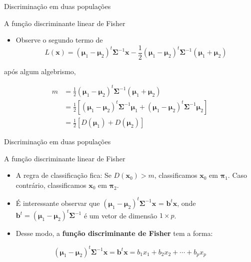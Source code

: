 \documentclass[
  ignorenonframetext,
  aspectratio=169,
]{beamer}
\providecommand{\tightlist}{%
  \setlength{\itemsep}{0pt}\setlength{\parskip}{0pt}}
\begin{document}
\begin{frame}{Discriminação em duas populações}
\label{discriminauxe7uxe3o-em-duas-populauxe7uxf5es-4}
\begin{block}{A função discriminante linear de Fisher}
\label{a-funuxe7uxe3o-discriminante-linear-de-fisher-4}
\begin{itemize}
\tightlist
\item
  Observe o segundo termo de \[
  L(\boldsymbol{x}) = (\boldsymbol{\mu}_1 - \boldsymbol{\mu}_2)^t \boldsymbol{\Sigma}^{-1} \boldsymbol{x} - \displaystyle{\frac{1}{2}(\boldsymbol{\mu}_1 - \boldsymbol{\mu}_2)^t \boldsymbol{\Sigma}^{-1}(\boldsymbol{\mu}_1 + \boldsymbol{\mu}_2)}
  \]
\end{itemize}

após algum algebrismo,

\[
\begin{aligned}
m &= \displaystyle{\frac{1}{2}(\boldsymbol{\mu}_1 - \boldsymbol{\mu}_2)^t \boldsymbol{\Sigma}^{-1}(\boldsymbol{\mu}_1 + \boldsymbol{\mu}_2)} \\ &= 
\displaystyle{\frac{1}{2}} \left[(\boldsymbol{\mu}_1 - \boldsymbol{\mu}_2)^t \boldsymbol{\Sigma}^{-1} \boldsymbol{\mu}_1 + (\boldsymbol{\mu}_1 - \boldsymbol{\mu}_2)^t \boldsymbol{\Sigma}^{-1} \boldsymbol{\mu}_2\right] \\ &=
\displaystyle{\frac{1}{2}} \left[ D(\boldsymbol{\mu}_1) + D(\boldsymbol{\mu}_2) \right] 
\end{aligned}
\]
\end{block}
\end{frame}

\begin{frame}{Discriminação em duas populações}
\label{discriminauxe7uxe3o-em-duas-populauxe7uxf5es-5}
\begin{block}{A função discriminante linear de Fisher}
\label{a-funuxe7uxe3o-discriminante-linear-de-fisher-5}
\begin{itemize}
\item
  A regra de classificação fica: Se \(D(\boldsymbol{x}_0)  > m\),
  classificamos \(\boldsymbol{x}_0\) em \(\boldsymbol{\pi}_1\). Caso
  contrário, classificamos \(\boldsymbol{x}_0\) em
  \(\boldsymbol{\pi}_2\).
\item
  É interessante observar que
  \((\boldsymbol{\mu}_1 - \boldsymbol{\mu}_2)^t \boldsymbol{\Sigma}^{-1}\boldsymbol{x}\)
  = \(\boldsymbol{b}^t \boldsymbol{x}\), onde
  \(\boldsymbol{b}^t = (\boldsymbol{\mu}_1 - \boldsymbol{\mu}_2)^t \boldsymbol{\Sigma}^{-1}\)
  é um vetor de dimensão \(1 \times p\).
\item
  Desse modo, a \textbf{função discriminante de Fisher} tem a forma:
\end{itemize}

\[(\boldsymbol{\mu}_1 - \boldsymbol{\mu}_2)^t \boldsymbol{\Sigma}^{-1} \boldsymbol{x} = \boldsymbol{b}^t \boldsymbol{x} = b_1x_1 + b_2x_2 + \cdots + b_px_p\]
\end{block}
\end{frame}
\end{document}
